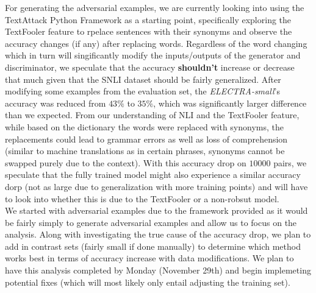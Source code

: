 \documentclass{article}
\begin{document}
For generating the adversarial examples, we are currently looking into using the TextAttack Python Framework as a starting point, specifically  exploring the TextFooler feature to rpelace sentences with their synonyms and observe the accuracy changes (if any) after replacing words. Regardless of the word changing which in turn will singificantly modify the inputs/outputs of the generator and discriminator, we speculate that the accuracy \textbf{shouldn't} increase or decrease that much given that the SNLI dataset should be fairly generalized. After modifying some examples from the evaluation set, the \textit{ELECTRA-small}'s accuracy was reduced from $43\%$ to $35\%$, which was significantly larger difference than we expected. From our understanding of NLI and the TextFooler feature, while based on the dictionary the words were replaced with synonyms, the replacements could lead to grammar errors as well as loss of comprehension (similar to machine translations as in certain phrases, synonyms cannot be swapped purely due to the context). With this accuracy drop on $10000$ pairs, we speculate that the fully trained model might also experience a similar accuracy dorp (not as large due to generalization with more training points) and will have to look into whether this is due to the TextFooler or a non-robsut model. \\

We started with adversarial examples due to the framework provided as it would be fairly simply to generate adversarial examples and allow us to focus on the analysis. Along with investigating the true cause of the accuracy drop, we plan to add in contrast sets (fairly small if done manually) to determine which method works best in terms of accuracy increase with data modifications. We plan to have this analysis completed by Monday (November 29th) and begin implemeting potential fixes (which will most likely only entail adjusting the training set).
\end{document}

